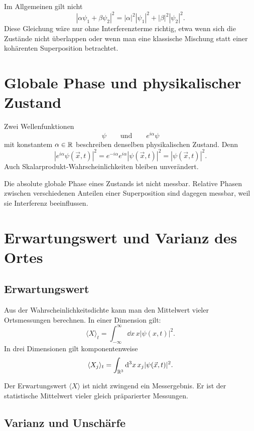\begin{notebox}
Im Allgemeinen gilt nicht
\[
    |\alpha\psi_1+\beta\psi_2|^2
    =|\alpha|^2|\psi_1|^2+|\beta|^2|\psi_2|^2.
\]
Diese Gleichung wäre nur ohne Interferenzterme richtig, etwa wenn sich die Zustände nicht überlappen oder wenn man eine klassische Mischung statt einer kohärenten Superposition betrachtet.
\end{notebox}

\section{Globale Phase und physikalischer Zustand}

Zwei Wellenfunktionen
\[
    \psi
    \qquad\text{und}\qquad
    e^{i\alpha}\psi
\]
mit konstantem $\alpha\in\mathbb{R}$ beschreiben denselben physikalischen Zustand. Denn
\[
    |e^{i\alpha}\psi(\vec{x},t)|^2
    =e^{-i\alpha}e^{i\alpha}|\psi(\vec{x},t)|^2
    =|\psi(\vec{x},t)|^2.
\]
Auch Skalarprodukt-Wahrscheinlichkeiten bleiben unverändert.

\begin{conceptbox}
Die absolute globale Phase eines Zustands ist nicht messbar. Relative Phasen zwischen verschiedenen Anteilen einer Superposition sind dagegen messbar, weil sie Interferenz beeinflussen.
\end{conceptbox}

\section{Erwartungswert und Varianz des Ortes}

\subsection{Erwartungswert}

Aus der Wahrscheinlichkeitsdichte kann man den Mittelwert vieler Ortsmessungen berechnen. In einer Dimension gilt:
\[
    \langle X\rangle_t
    =\int_{-\infty}^{\infty}\dd x\,x|\psi(x,t)|^2.
\]
In drei Dimensionen gilt komponentenweise
\[
    \langle X_j\rangle_t
    =\int_{\mathbb{R}^3}\mathrm{d}^3x\,x_j|\psi(\vec{x},t)|^2.
\]

\begin{definitionbox}
Der Erwartungswert $\langle X\rangle$ ist nicht zwingend ein Messergebnis. Er ist der statistische Mittelwert vieler gleich präparierter Messungen.
\end{definitionbox}

\subsection{Varianz und Unschärfe}

